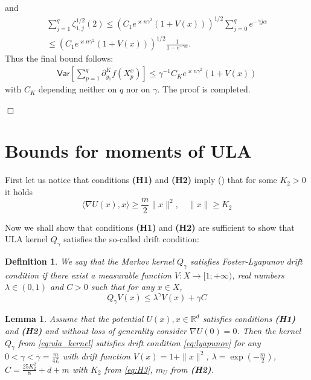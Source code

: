 \documentclass[bj]{imsart}
\newcommand{\ps}[2]{\langle #1, #2 \rangle}
\newcommand{\proofendsign}{$\Box$}
\newtheorem{definition}{Definition}
\newtheorem{lem}[thm]{Lemma}
\newenvironment{proof}{{\noindent \bf Proof }}
 {{\hspace*{\fill}\proofendsign\par\bigskip}}
\begin{document}
\begin{proof}
and
\begin{align*}
\sum_{j=1}^{q} \zeta^{1/2}_{1,j}(2) \leq (C_1e^{\varkappa n\gamma^2}(1+V(x)))^{1/2}\sum_{j=0}^{q}e^{-\gamma j\alpha} 
\\
\leq  (C_1e^{\varkappa n\gamma^2}(1+V(x)))^{1/2}\frac{ 1}{1-e^{- \gamma\alpha}}.
\end{align*}
Thus the final bound follows:
\begin{align*}
\mathsf{Var}\left[\sum_{p=1}^{q}\partial_{y_{1}}^{K}f\left(X^x_{p}\right)\right] \leq \gamma^{-1} C_K e^{\varkappa n\gamma^2} (1+V(x))
\end{align*}
 with $C_K$  depending neither on $q$ nor on $\gamma$. The proof is completed.
\end{proof}


\appendix
\section{Bounds for moments of  ULA}\label{sec:appendix}
First let us notice that conditions {\bf (H1)} and {\bf (H2)} imply (\cite[Lemma~16]{brosse2018diffusion}) that for some $K_2 > 0$ it holds
\begin{equation}
\label{eq:H3}
\ps{\nabla U(x)}{x} \geq \frac{m}{2}\|x\|^2, \quad \|x\| \geq K_2
\end{equation}

Now we shall show that conditions {\bf (H1)} and {\bf (H2)} are sufficient to show that ULA kernel $Q_\gamma$ satisfies the so-called drift condition:
\begin{definition}
\label{def:drift}
We say that the Markov kernel $Q_{\gamma}$ satisfies Foster-Lyapunov drift condition if there exist a measurable function $V: X \rightarrow [1; +\infty)$, real numbers $\lambda \in (0,1)$ and $C > 0$ such that for any $x \in X$,
\begin{equation}
\label{eq:lyapunov}
Q_{\gamma}V(x) \leq \lambda^{\gamma} V(x) + \gamma C
\end{equation}
\end{definition}

\begin{lem}
\label{lem:drift}
 Assume that the potential $U(x), x \in \mathbb{R}^d$ satisfies conditions {\bf (H1)} and {\bf (H2)} and without loss of generality consider $\nabla U(0) = 0$. Then the kernel $Q_\gamma$ from \eqref{eq:ula_kernel} satisfies drift condition \eqref{eq:lyapunov} for any $0 < \gamma < \overline{\gamma} = \frac{m}{4L}$ with drift function $V(x) = 1 + \|x\|^2$,   $\lambda = \exp{\left(-\frac{m}{2}\right)}$, $C = \frac{25K_2^2}{8} + d + m$ with $K_2$ from \eqref{eq:H3}, $m_U$ from {\bf (H2)}.
\end{lem}
\end{document}
